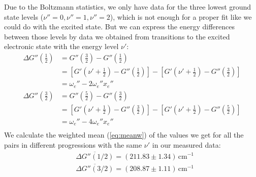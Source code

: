 Due to the Boltzmann statistics, we only have data for the three lowest ground state levels
($\nu''=0,\nu''=1,\nu''=2$), which is
not enough for a proper fit like we could do with the excited state.
But we can express the energy differences between those levels by data we obtained from transitions
to the excited electronic state with the energy level $\nu'$:
\begin{equation}
\begin{split}
  \Delta G''\left( \frac{1}{2}\right)  &  =
   G''\left( \frac{3}{2}\right)-G''\left( \frac{1}{2}\right)   \\
 & = \left[G'\left(\nu'+\frac{1}{2}\right)-G''\left(\frac{1}{2}\right)\right]-
\left[G'\left(\nu'+\frac{1}{2}\right)-G''\left(\frac{3}{2}\right)\right]\\
& = \omega_e''-2\omega_e''x_e''\\
  \Delta G''\left( \frac{3}{2}\right)  &  =
   G''\left( \frac{5}{2}\right)-G''\left( \frac{3}{2}\right)\\
   & = \left[G'\left(\nu'+\frac{1}{2}\right)-G''\left(\frac{3}{2}\right)\right]-
\left[G'\left(\nu'+\frac{1}{2}\right)-G''\left(\frac{5}{2}\right)\right]\\
& = \omega_e''-4\omega_e''x_e''\\
  \end{split}
\end{equation}
We calculate the weighted mean (\autoref{eq:meanw}) of the values
we get for all the pairs in different progressions
with the same $\nu'$ in our measured data:
\begin{equation}
\begin{split}
 & \overline{\Delta G''(1/2)}= (211.83 \pm 1.34)\,\text{cm}^{-1}\\
 & \overline{\Delta G''(3/2)}= (208.87 \pm 1.11)\,\text{cm}^{-1}
 \end{split}
\end{equation}


